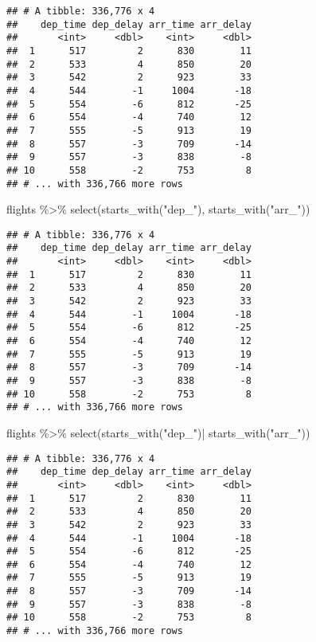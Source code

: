 \documentclass[
]{article}
\newenvironment{Shaded}{\begin{snugshade}}{\end{snugshade}}
\newcommand{\FunctionTok}[1]{\textcolor[rgb]{0.00,0.00,0.00}{#1}}
\newcommand{\NormalTok}[1]{#1}
\newcommand{\SpecialCharTok}[1]{\textcolor[rgb]{0.00,0.00,0.00}{#1}}
\newcommand{\StringTok}[1]{\textcolor[rgb]{0.31,0.60,0.02}{#1}}
\begin{document}
\begin{verbatim}
## # A tibble: 336,776 x 4
##    dep_time dep_delay arr_time arr_delay
##       <int>     <dbl>    <int>     <dbl>
##  1      517         2      830        11
##  2      533         4      850        20
##  3      542         2      923        33
##  4      544        -1     1004       -18
##  5      554        -6      812       -25
##  6      554        -4      740        12
##  7      555        -5      913        19
##  8      557        -3      709       -14
##  9      557        -3      838        -8
## 10      558        -2      753         8
## # ... with 336,766 more rows
\end{verbatim}

\begin{Shaded}
\begin{Highlighting}[]
\NormalTok{flights }\SpecialCharTok{\%\textgreater{}\%} \FunctionTok{select}\NormalTok{(}\FunctionTok{starts\_with}\NormalTok{(}\StringTok{"dep\_"}\NormalTok{), }\FunctionTok{starts\_with}\NormalTok{(}\StringTok{"arr\_"}\NormalTok{))}
\end{Highlighting}
\end{Shaded}

\begin{verbatim}
## # A tibble: 336,776 x 4
##    dep_time dep_delay arr_time arr_delay
##       <int>     <dbl>    <int>     <dbl>
##  1      517         2      830        11
##  2      533         4      850        20
##  3      542         2      923        33
##  4      544        -1     1004       -18
##  5      554        -6      812       -25
##  6      554        -4      740        12
##  7      555        -5      913        19
##  8      557        -3      709       -14
##  9      557        -3      838        -8
## 10      558        -2      753         8
## # ... with 336,766 more rows
\end{verbatim}

\begin{Shaded}
\begin{Highlighting}[]
\NormalTok{flights }\SpecialCharTok{\%\textgreater{}\%} \FunctionTok{select}\NormalTok{(}\FunctionTok{starts\_with}\NormalTok{(}\StringTok{"dep\_"}\NormalTok{)}\SpecialCharTok{|} \FunctionTok{starts\_with}\NormalTok{(}\StringTok{"arr\_"}\NormalTok{))}
\end{Highlighting}
\end{Shaded}

\begin{verbatim}
## # A tibble: 336,776 x 4
##    dep_time dep_delay arr_time arr_delay
##       <int>     <dbl>    <int>     <dbl>
##  1      517         2      830        11
##  2      533         4      850        20
##  3      542         2      923        33
##  4      544        -1     1004       -18
##  5      554        -6      812       -25
##  6      554        -4      740        12
##  7      555        -5      913        19
##  8      557        -3      709       -14
##  9      557        -3      838        -8
## 10      558        -2      753         8
## # ... with 336,766 more rows
\end{verbatim}
\end{document}
